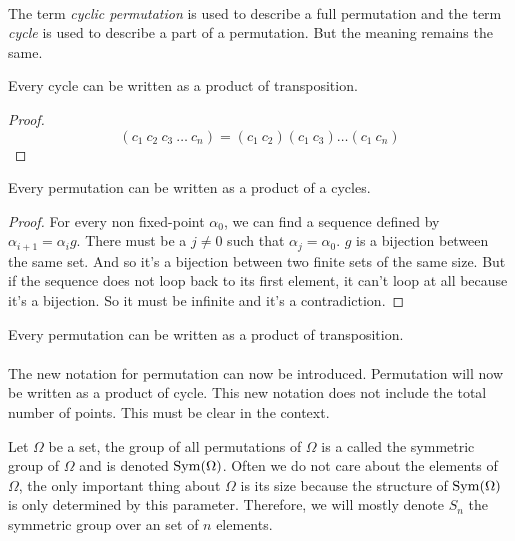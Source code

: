 \paragraph{}
The term \textit{cyclic permutation} is used to describe a full permutation and the term \textit{cycle} is used to describe a part of a permutation. But the meaning remains the same.

\begin{proposition}
  Every cycle can be written as a product of transposition.
\end{proposition}

\begin{proof}
  \[
    (c_1\ c_2\ c_3\ \dots\ c_n) = (c_1\ c_2)(c_1\ c_3)\dots(c_1\ c_n)
  \]
\end{proof}

\begin{proposition}
  Every permutation can be written as a product of a cycles.
\end{proposition}

\begin{proof}
  For every non fixed-point $\alpha_0$, we can find a sequence defined by $\alpha_{i+1} = \alpha_i g$. There must be a $j \neq 0$ such that $\alpha_j = \alpha_0$. $g$ is a bijection between the same set. And so it's a bijection between two finite sets of the same size. But if the sequence does not loop back to its first element, it can't loop at all because it's a bijection. So it must be infinite and it's a contradiction.
\end{proof}

\begin{corollary}
  Every permutation can be written as a product of transposition.
\end{corollary}

\paragraph{}
The new notation for permutation can now be introduced. Permutation will now be written as a product of cycle. This new notation does not include the total number of points. This must be clear in the context.

\begin{definition}
  Let $\Omega$ be a set, the group of all permutations of $\Omega$ is a called the symmetric group of $\Omega$ and is denoted $\operatorname{Sym}(\Omega)$. Often we do not care about the elements of $\Omega$, the only important thing about $\Omega$ is its size because the structure of $\operatorname{Sym}(\Omega)$ is only determined by this parameter. Therefore, we will mostly denote $S_n$ the symmetric group over an set of $n$ elements.
\end{definition}

